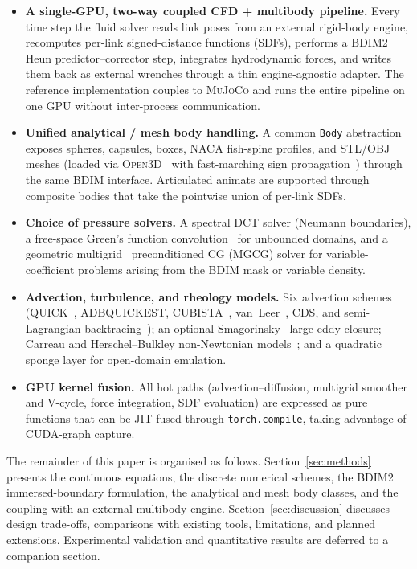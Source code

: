 \documentclass[journal,twoside,10pt]{IEEEtran}
\newcommand{\mujoco}{\textsc{MuJoCo}\xspace}
\begin{document}
\begin{itemize}
\item \textbf{A single-GPU, two-way coupled CFD + multibody pipeline.}
  Every time step the fluid solver reads link poses from an external
  rigid-body engine, recomputes per-link signed-distance functions
  (SDFs), performs a BDIM2 Heun predictor--corrector step, integrates
  hydrodynamic forces, and writes them back as external wrenches
  through a thin engine-agnostic adapter.  The reference implementation
  couples to \mujoco and runs the entire pipeline on one GPU without
  inter-process communication.
\item \textbf{Unified analytical / mesh body handling.}  A common
  \texttt{Body} abstraction exposes spheres, capsules, boxes, NACA
  fish-spine profiles, and STL/OBJ meshes (loaded via
  \textsc{Open3D}~\cite{zhou2018open3d} with fast-marching sign
  propagation~\cite{sethian1996fastmarch}) through the same BDIM
  interface.  Articulated animats are supported through composite
  bodies that take the pointwise union of per-link SDFs.
\item \textbf{Choice of pressure solvers.}
  A spectral DCT solver (Neumann boundaries), a free-space Green's
  function convolution~\cite{hejlesen2013high} for unbounded domains,
  and a geometric multigrid~\cite{trottenberg2001multigrid}
  preconditioned CG (MGCG) solver for variable-coefficient problems
  arising from the BDIM mask or variable density.
\item \textbf{Advection, turbulence, and rheology models.}  Six
  advection schemes (QUICK~\cite{leonard1979quick},
  ADBQUICKEST, CUBISTA~\cite{alves2003convergent},
  van~Leer~\cite{vanleer1979towards}, CDS, and semi-Lagrangian
  backtracing~\cite{stam1999stable}); an optional
  Smagorinsky~\cite{smagorinsky1963general} large-eddy closure;
  Carreau and Herschel--Bulkley non-Newtonian
  models~\cite{bird1987dynamics}; and a quadratic sponge layer for
  open-domain emulation.
\item \textbf{GPU kernel fusion.}  All hot paths
  (advection--diffusion, multigrid smoother and V-cycle, force
  integration, SDF evaluation) are expressed as pure functions that
  can be JIT-fused through \texttt{torch.compile}, taking advantage
  of CUDA-graph capture.
\end{itemize}

The remainder of this paper is organised as follows.
Section~\ref{sec:methods} presents the continuous equations, the
discrete numerical schemes, the BDIM2 immersed-boundary formulation,
the analytical and mesh body classes, and the coupling with an external
multibody engine.  Section~\ref{sec:discussion} discusses design
trade-offs, comparisons with existing tools, limitations, and
planned extensions.  Experimental validation and quantitative results
are deferred to a companion section.
\end{document}

